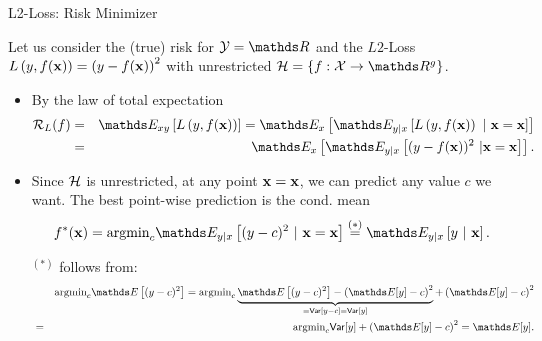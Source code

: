 \documentclass[11pt,compress,t,notes=noshow, xcolor=table]{beamer}
\begin{document}
\begin{vbframe}{L2-Loss: Risk Minimizer}

Let us consider the (true) risk for  $\Yspace = \R$ and the $L2$-Loss $L\left(y, f(\mathbf{x})\right) = \left(y-f(\mathbf{x})\right)^2$ with unrestricted $\Hspace = \{f: \Xspace \to \R^g\}$. 

\begin{itemize}
\item By the law of total expectation
  \begin{eqnarray*}
    \risk_L(f) &=& \E_{xy} \left[\Lxy\right] 
    = \E_x \left[\E_{y|x}\left[\Lxy~|~\xv = \xv\right]\right] \\
  &=& \E_x
  \left[\E_{y|x}\left[(y-\fx)^2~|\xv = \xv\right]\right]. 
  \end{eqnarray*}

\item Since $\mathcal{H}$ is unrestricted, at any point $\mathbf{x} = \mathbf{x}$, we can predict any value $c$ we want. The best point-wise prediction is the cond. mean
$$
  \fxbayes = \mbox{argmin}_c \E_{y|x}\left[(y - c)^2 ~|~ \xv = \xv \right]\overset{(*)}{=} \E_{y|x} \left[y ~|~ \xv \right]. 
$$

\begin{footnotesize}
$^{(*)}$ follows from:
  \begin{eqnarray*}
  && \mbox{argmin}_c \E\left[(y - c)^2\right] = \mbox{argmin}_c \underbrace{\E\left[(y - c)^2\right] - \left(\E[y] - c\right)^2}_{= \var[y - c] = \var[y]} + \left(\E[y] - c\right)^2 \\ &=& \mbox{argmin}_c \var[y] + \left(\E[y] - c\right)^2 = \E[y]. 
  \end{eqnarray*}
\end{footnotesize}

\end{itemize}


\end{vbframe}
\end{document}
